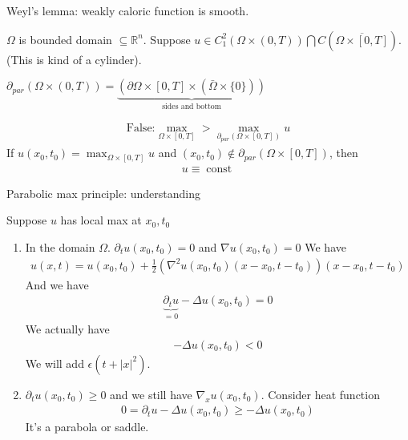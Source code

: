 \documentclass[11pt]{article}
\begin{document}
Weyl's lemma: weakly caloric function is smooth.

\begin{theorem}
    $\Omega$ is bounded domain $\subseteq \mathbb{R}^{n}$. Suppose $u \in C^{2}_{1}(\Omega \times (0,T))
    \bigcap C(\overline{\Omega \times [0,T]})$. (This is kind of a cylinder).

     $\partial_{par}(\Omega \times (0,T)) = \underbrace{(\partial \Omega \times [0,T] \times 
     (\bar{\Omega} \times \{ 0 \}))}_{\text{sides and bottom}}$

     \begin{align*}
        \text{False:} \max_{\Omega \times [0,T]} > \max_{\partial_{par}(\Omega \times [0,T])}u
     \end{align*}
     If $u(x_0,t_0) = \max_{\Omega \times [0,T]}u$ and $(x_0,t_0) \notin \partial_{par}
     (\Omega \times [0,T])$, then 
     \begin{align*}
        u \equiv \operatorname{const}
     \end{align*}
\end{theorem}

Parabolic max principle: understanding

Suppose $u$ has local max at $x_0, t_0$
\begin{enumerate}
    \item In the domain $\Omega$. $\partial_{t}u(x_0, t_0) = 0$ and $\nabla u(x_0,t_0) = 0$
    We have 
    \begin{align*}
        u(x,t) = u(x_0,t_0) + \frac{1}{2}(\nabla^{2}u(x_0,t_0)(x-x_0,t-t_0))(x-x_0,t-t_0)
    \end{align*}
    And we have 
    \begin{align*}
        \underbrace{\partial_{t}u}_{ = 0} - \Delta u(x_0,t_0) = 0
    \end{align*}
    We actually have 
    \begin{align*}
        -\Delta u (x_0,t_0) < 0
    \end{align*}
    We will add $\epsilon(t + |x|^{2})$.
    \item $\partial_{t}u(x_0,t_0) \ge 0$ and we still have $\nabla_{x}u(x_0,t_0)$.
    Consider heat function
    \begin{align*}
        0 = \partial_{t}u - \Delta u(x_0,t_0) \ge -\Delta u(x_0,t_0)
    \end{align*}
    It's a parabola or saddle.

\end{enumerate}
\end{document}
